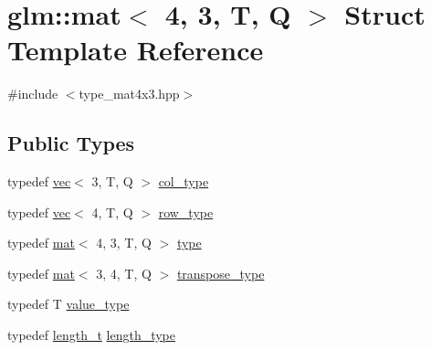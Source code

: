 \hypertarget{structglm_1_1mat_3_014_00_013_00_01_t_00_01_q_01_4}{}\section{glm\+:\+:mat$<$ 4, 3, T, Q $>$ Struct Template Reference}
\label{structglm_1_1mat_3_014_00_013_00_01_t_00_01_q_01_4}


{\ttfamily \#include $<$type\+\_\+mat4x3.\+hpp$>$}

\subsection*{Public Types}
\begin{DoxyCompactItemize}
\item 
typedef \hyperlink{structglm_1_1vec}{vec}$<$ 3, T, Q $>$ \hyperlink{structglm_1_1mat_3_014_00_013_00_01_t_00_01_q_01_4_ab7cb76d6290691108c8af724270e3b6c}{col\+\_\+type}
\item 
typedef \hyperlink{structglm_1_1vec}{vec}$<$ 4, T, Q $>$ \hyperlink{structglm_1_1mat_3_014_00_013_00_01_t_00_01_q_01_4_ab68daf8d119fa525c762d6ba0bc08538}{row\+\_\+type}
\item 
typedef \hyperlink{structglm_1_1mat}{mat}$<$ 4, 3, T, Q $>$ \hyperlink{structglm_1_1mat_3_014_00_013_00_01_t_00_01_q_01_4_a5c9dc0bf9dfa3af93210f80d90257861}{type}
\item 
typedef \hyperlink{structglm_1_1mat}{mat}$<$ 3, 4, T, Q $>$ \hyperlink{structglm_1_1mat_3_014_00_013_00_01_t_00_01_q_01_4_ab3a05b21cd6b51243140b2bdbf77108a}{transpose\+\_\+type}
\item 
typedef T \hyperlink{structglm_1_1mat_3_014_00_013_00_01_t_00_01_q_01_4_ad5a9ca85d27eb13ba59ee335bdb6783f}{value\+\_\+type}
\item 
typedef \hyperlink{namespaceglm_a090a0de2260835bee80e71a702492ed9}{length\+\_\+t} \hyperlink{structglm_1_1mat_3_014_00_013_00_01_t_00_01_q_01_4_a24f0f2085bebe0a6e79da267368e74f5}{length\+\_\+type}
\end{DoxyCompactItemize}
